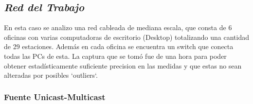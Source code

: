 \subsection{\emph{Red del Trabajo}}

En esta caso se analizo una red cableada de mediana escala, que consta de 6
oficinas con varias computadoras de escritorio (Desktop) totalizando una
cantidad de 29 estaciones. Además en cada oficina se encuentra un switch que
conecta todas las PCs de esta. La captura que se tomó fue de una hora para
poder obtener estadísticamente suficiente precision en las medidas y que estas
no sean alteradas por posibles `outliers`.

\subsubsection{Fuente Unicast-Multicast}

\begin{figure}
	\begin{minipage}[b]{0.9\linewidth}
	\end{minipage}
\end{figure}


